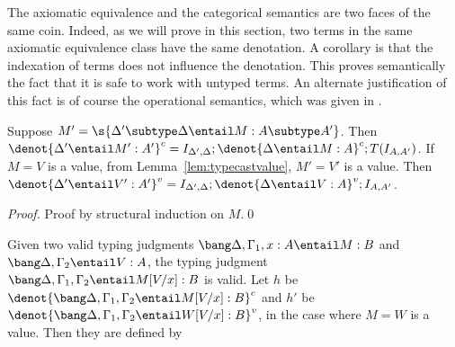 \documentclass{llncs}
\begin{document}
The axiomatic equivalence and the categorical semantics are two faces
of the same coin.
Indeed, as we will prove in this section, two terms
in the same axiomatic equivalence class have the same
denotation. A corollary is that the indexation of terms does not
influence the denotation. This proves semantically the fact that it is
safe to work with untyped terms. An alternate justification of this
fact is of course the operational semantics, which was given in
{\cite{selinger05lambda}}.

\begin{lemma}\label{lem:denottypecast}
  Suppose $M'=\s{\Delta'\subtype\Delta\entail M:A\subtype A'}$.
  Then
  $\denot{\Delta'\entail M':A'}^c =
  I_{\Delta',\Delta};\denot{\Delta\entail M:A}^c;T(I_{A,A'})$.
  If $M=V$ is a value, from Lemma~\ref{lem:typecastvalue}, 
  $M'=V'$ is a value. Then
  $\denot{\Delta'\entail V':A'}^v =
  I_{\Delta',\Delta};\denot{\Delta\entail V:A}^v;I_{A,A'}$.
\end{lemma}

\begin{proof}
  Proof by structural induction on $M$.\qed
\end{proof}


\begin{lemma}[Substitution]\label{lem:substitution}
  Given two valid typing judgments $\bang\Delta,\Gamma_1,x:A\entail
  M:B$ and $\bang\Delta,\Gamma_2\entail
  V:A$, the typing judgment
  $\bang\Delta,\Gamma_1,\Gamma_2\entail
  M[V/x]:B$ is valid. Let $h$ be
  $\denot{\bang\Delta,\Gamma_1,\Gamma_2\entail M[V/x]:B}^c$
  and $h'$ be $\denot{\bang\Delta,\Gamma_1,\Gamma_2\entail W[V/x]:B}^v$,
  in the case where $M=W$ is a value. Then they are defined by\\
\end{lemma}
\end{document}

